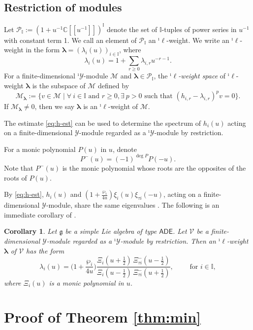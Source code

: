 \documentclass[11pt,reqno]{amsart}
\numberwithin{equation}{section}
\newtheorem{cor}[thm]{Corollary}
\theoremstyle{definition}
\theoremstyle{remark}
\newcommand{\bC}{\mathbb{C}}
\newcommand{\mc}{\mathcal}
\newcommand{\hf}{\tfrac12}
\newcommand{\g}{\mathfrak{g}}
\newcommand{\gge}{\geqslant}
\newcommand{\la}{\lambda}
\newcommand{\bla}{\bm\lambda}
\newcommand{\I}{{\mathbb I}}
\newcommand{\Y}{{\mathscr{Y}}}
\newcommand{\Yi}{{^\imath\mathscr{Y}}}
\begin{document}
\subsection{Restriction of modules}
Let $\mathscr P_\I:=(1+u^{-1}\bC[\![u^{-1}]\!])^{\I}$ denote the set of $\I$-tuples of power series in $u^{-1}$ with constant term 1. We call an element of $\mathscr P_{\I}$ an $^\imath\bm\ell$-weight. We write an $^\imath\bm\ell$-weight in the form $\bla=(\la_i(u))_{i\in \I}$, 
where
\[
\la_i(u)=1+\sum_{r\gge 0}\la_{i,r}u^{-r-1}.
\]
For a finite-dimensional $\Yi$-module $\mc M$ and $\bla\in\mathscr P_{\I}$, the \textit{$^\imath\bm\ell$-weight space} of $^\imath\bm\ell$-weight $\bla$ is the subspace of $\mc M$ defined by
\[
\mc M_{\bla}:=\big\{v\in \mc M\mid \forall~ i\in\I \text{ and }r\gge 0, \exists~ p>0 \text{ such that } (h_{i,r}-\la_{i,r})^pv=0\big\}.
\]
If $\mc M_{\bla}\ne 0$, then we say $\bla$ is an $^\imath\bm\ell$-weight of $\mc M$.

The estimate \eqref{eq:h-est} can be used to determine the spectrum of $h_i(u)$ acting on a finite-dimensional $\Y$-module regarded as a $\Yi$-module by restriction. 

For a monic polynomial $P(u)$ in $u$, denote
\[
P^-(u)=(-1)^{\deg P}P(-u).
\]
Note that $P^-(u)$ is the monic polynomial whose roots are the opposites of the roots of $P(u)$. 

By \eqref{eq:h-est}, $h_i(u)$ and $(1+\frac{\wp_i}{4u})\xi_i(u)\xi_{\tau i}(-u)$, acting on a finite-dimensional $\Y$-module, share the same eigenvalues . The following is an immediate corollary of \cite[Theorem~1]{Kn95}. 

\begin{cor}\label{cor:cha}
Let $\g$ be a simple Lie algebra of type $\mathsf{ADE}$. Let $\mathscr V$ be a finite-dimensional $\Y$-module regarded as a $\Yi$-module by restriction. Then an $^\imath\bm\ell$-weight $\bm\la$ of $\mathscr V$ has the form
\[
\la_i(u)=\Big(1+\frac{\wp_i}{4u}\Big)\frac{\Xi_i(u+\hf )\,\Xi_{\tau i}^-(u-\hf )}{\Xi_i(u-\hf )\,\Xi_{\tau i}^-(u+\hf )},\qquad \text{ for }i\in \I,
\]
where $\Xi_i(u)$ is a monic polynomial in $u$.
\end{cor}

\section{Proof of Theorem \ref{thm:min}}\label{sec:pf-thm1}
\end{document}

